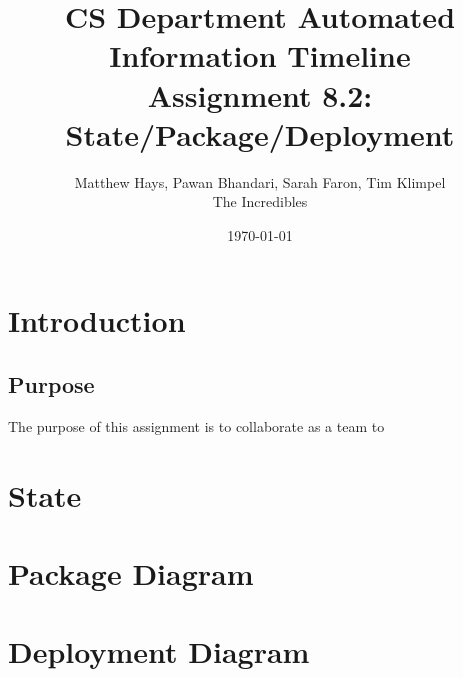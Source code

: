 \documentclass{article}
\title{CS Department Automated Information Timeline \\ Assignment 8.2: State/Package/Deployment}
\date{\today}
\author{Matthew Hays, Pawan Bhandari, Sarah Faron, Tim Klimpel \\ The Incredibles}
\begin{document}
\maketitle
\newpage
\tableofcontents
\listoffigures
\newpage
\section{Introduction}
\subsection{Purpose}
The purpose of this assignment is to collaborate as a team to

\section{State}


\section{Package Diagram}


\section{Deployment Diagram}

\end{document}
